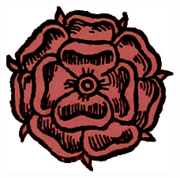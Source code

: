 \bigskip
\begin{figure}[h!]
\centering
   \includegraphics[width=0.5\textwidth]{images/brev47.png}
 \end{figure}
 

\breakpage